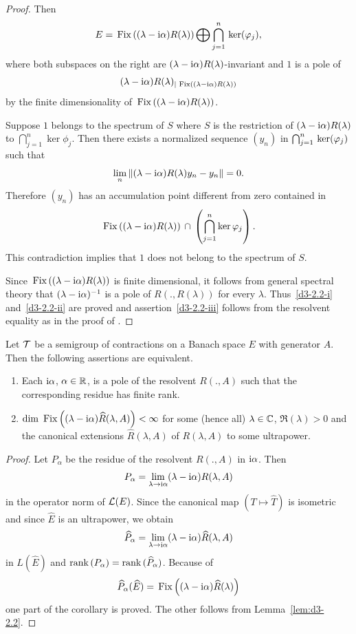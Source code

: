 \begin{proof}
Then
\[
E = \Fix{(\lambda - \im\alpha)R(\lambda)} \bigoplus \bigcap_{j=1}^{n} \Kern{\phi_{j}},
\]
where both subspaces on the right are 
$(\lambda - \mathrm{i}\alpha)R(\lambda)$-invariant and $1$ is a pole of 
\[
(\lambda-\mathrm{i}\alpha)R(\lambda)_{\vert \mathop{}\mathrm{Fix}\left( (\lambda-\mathrm{i}\alpha) R(\lambda)\right)}
\]
by the finite dimensionality of\/ $\mathop{}\mathrm{Fix}\left((\lambda - \mathrm{i}\alpha)R(\lambda)\right)$.

Suppose $1$ belongs to the spectrum of\/ $S$ where $S$ is the restriction of 
$(\lambda-\mathrm{i}\alpha)R(\lambda)$ to $\bigcap_{j=1}^{n} \ker\phi_{j}$.
Then there exists a normalized sequence $(y_{n})$ in 
$\bigcap_{j=1}^{n} \Kern{\phi_{j}}$ such that
\[
\lim_{n} \|(\lambda - \mathrm{i}\alpha)R(\lambda)y_{n} - y_{n}\| = 0 .
\]
Therefore $(y_{n})$ has an accumulation point different from zero contained in
\[
\Fix{(\lambda - \im\alpha)R(\lambda)} \, \cap \,\left( \bigcap_{j=1}^{n} \ker\phi_{j} \right) .
\]
This contradiction implies that $1$ does not belong to the spectrum of\/ $S$.

Since $\mathop{}\mathrm{Fix}\left((\lambda - \mathrm{i}\alpha)R(\lambda)\right)$ is finite dimensional, it follows from general spectral theory that $(\lambda - \mathrm{i}\alpha)^{-1}$ is a pole of\/ $R(.,R(\lambda))$ for every $\lambda$.
Thus~\ref{d3-2.2-i} and~\ref{d3-2.2-ii} are proved and assertion~\ref{d3-2.2-iii} follows from the resolvent equality as in the proof of \textcite[Proposition 1.2]{greiner:1981}.
\end{proof}
\begin{proposition}\label{prop:d3-2.3}
Let $\mathcal{T}$ be a semigroup of contractions on a Banach space $E$ with generator $A$.
Then the following assertions are equivalent.
\begin{enumerate}[\upshape (a)]

\item
Each $\mathrm{i}\alpha$, $\alpha \in \mathbb{R}$, is a pole of the resolvent $R(.,A)$ such that the corresponding residue has finite rank.

\item
$\mathop{}\!\mathrm{dim}\, \mathop{}\mathrm{Fix}\left((\lambda - \mathrm{i}\alpha)\widehat{R}(\lambda,A)\right) < \infty$ for some (hence all) $\lambda \in \mathbb{C}$, $\Re(\lambda) > 0$ and the canonical extensions $\widehat{R}(\lambda,A)$ of\/ $R(\lambda,A)$ to some ultrapower.

\end{enumerate}
\end{proposition}
\begin{proof}
Let $P_{\alpha}$ be the residue of the resolvent $R(.,A)$ in $\mathrm{i}\alpha$.
Then 
\[
P_{\alpha} = \lim_{\lambda \to \mathrm{i}\alpha}(\lambda - \mathrm{i}\alpha)R(\lambda,A)
\]
in the operator norm of\/ $\mathcal{L}(E)$.
Since the canonical map $(T \mapsto \widehat{T})$ is isometric and since $\widehat{E}$ is an ultrapower, we obtain
\[
\widehat{P}_{\alpha} = \lim_{\lambda \to \mathrm{i}\alpha}(\lambda - \mathrm{i}\alpha)\widehat{R}(\lambda,A)
\]
in $L(\widehat{E})$ and $\mathop{}\!\mathrm{rank}\,(P_{\alpha}) = \mathop{}\!\mathrm{rank}\,(\widehat{P}_{\alpha})$.
Because of
\[
\widehat{P}_{\alpha}(\widehat{E}) = \mathop{}\mathrm{Fix}\left((\lambda-\mathrm{i}\alpha)\widehat{R}(\lambda)\right)
\]
one part of the corollary is proved. The other follows from Lemma~\ref{lem:d3-2.2}.
\end{proof}
